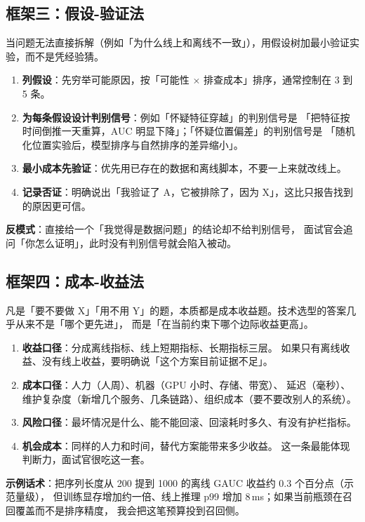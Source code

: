 \subsection{框架三：假设-验证法}

当问题无法直接拆解（例如「为什么线上和离线不一致」），用假设树加最小验证实验，而不是凭经验猜。

\begin{interview}[假设-验证的四步法]
\begin{enumerate}
  \item \textbf{列假设}：先穷举可能原因，按「可能性 $\times$ 排查成本」排序，通常控制在 3 到 5 条。
  \item \textbf{为每条假设设计判别信号}：例如「怀疑特征穿越」的判别信号是
        「把特征按时间倒推一天重算，AUC 明显下降」；「怀疑位置偏差」的判别信号是
        「随机化位置实验后，模型排序与自然排序的差异缩小」。
  \item \textbf{最小成本先验证}：优先用已存在的数据和离线脚本，不要一上来就改线上。
  \item \textbf{记录否证}：明确说出「我验证了 A，它被排除了，因为 X」，这比只报告找到的原因更可信。
\end{enumerate}
\textbf{反模式}：直接给一个「我觉得是数据问题」的结论却不给判别信号，
面试官会追问「你怎么证明」，此时没有判别信号就会陷入被动。
\end{interview}

\subsection{框架四：成本-收益法}

凡是「要不要做 X」「用不用 Y」的题，本质都是成本收益题。技术选型的答案几乎从来不是「哪个更先进」，
而是「在当前约束下哪个边际收益更高」。

\begin{interview}[成本-收益分析的四个口径]
\begin{enumerate}
  \item \textbf{收益口径}：分成离线指标、线上短期指标、长期指标三层。
        如果只有离线收益、没有线上收益，要明确说「这个方案目前证据不足」。
  \item \textbf{成本口径}：人力（人周）、机器（GPU 小时、存储、带宽）、
        延迟（毫秒）、维护复杂度（新增几个服务、几条链路）、组织成本（要不要改别人的系统）。
  \item \textbf{风险口径}：最坏情况是什么、能不能回滚、回滚耗时多久、有没有护栏指标。
  \item \textbf{机会成本}：同样的人力和时间，替代方案能带来多少收益。
        这一条最能体现判断力，面试官很吃这一套。
\end{enumerate}
\textbf{示例话术}：把序列长度从 200 提到 1000 的离线 GAUC 收益约 0.3 个百分点（示范量级），
但训练显存增加约一倍、线上推理 p99 增加 8\,ms；如果当前瓶颈在召回覆盖而不是排序精度，
我会把这笔预算投到召回侧。
\end{interview}

